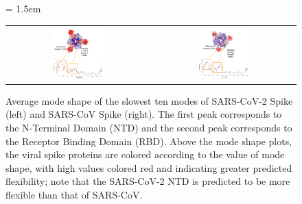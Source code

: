%

\begin{figure}[h]
	\centering
	\mySfFamily
	\tabcolsep = 1.5em
	\begin{tabular}{c c}
	\includegraphics[width = 0.38\textwidth]{../images/spike_slowmode_SARS-CoV-2.png} & \includegraphics[width = 0.38\textwidth]{../images/spike_slowmode_SARS-CoV.png}
	\end{tabular}
	\caption{Average mode shape of the slowest ten modes of SARS-CoV-2 Spike (left) and SARS-CoV Spike (right). The first peak corresponds to the N-Terminal Domain (NTD) and the second peak corresponds to the Receptor Binding Domain (RBD). Above the mode shape plots, the viral spike proteins are colored according to the value of mode shape, with high values colored red and indicating greater predicted flexibility; note that the SARS-CoV-2 NTD is predicted to be more flexible than that of SARS-CoV.}
	\label{fig:spike_slowmode_comparison}
\end{figure}

